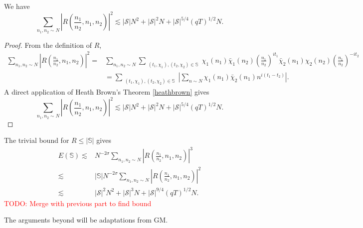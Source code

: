 \begin{lemma}
    We have 
\[
        \sum_{n_1,n_2\sim N}\left|R\left(\frac{n_1}{n_2},n_1,n_2\right) \right|^2\lesssim |\mathcal{S}|N^2+ |\mathcal{S}|^2N + |\mathcal{S}|^{5/4}(qT)^{1/2}N.
    \]
\end{lemma}
\begin{proof}
    From the definition of $R$, \begin{align*}
        \sum_{n_1,n_2\sim N}\left|R\left(\frac{n_1}{n_2},n_1,n_2\right) \right|^2=& \sum_{n_1,n_2\sim N}\sum_{\substack{(t_1,\chi_1),(t_2,\chi_2)\in \mathbb{S}}}
        \chi_1(n_1)\bar{\chi}_1(n_2)\left(\frac{n_1}{n_2}\right)^{it_1}\bar{\chi}_2(n_1){\chi}_2(n_2)\left(\frac{n_1}{n_2}\right)^{-it_2}
        \\
        &=\sum_{\substack{(t_1,\chi_1),(t_2,\chi_2)\in \mathbb{S}}}\left|\sum_{n\sim N}
        \chi_1(n_1)\bar{\chi}_2(n_1)n^{i(t_1-t_2)}\right|.
    \end{align*}
    A direct application of Heath Brown's Theorem \ref{heathbrown} gives \[
        \sum_{n_1,n_2\sim N}\left|R\left(\frac{n_1}{n_2},n_1,n_2\right) \right|^2\lesssim |\mathcal{S}|N^2+ |\mathcal{S}|^2N + |\mathcal{S}|^{5/4}(qT)^{1/2}N.
    \]
\end{proof}
The trivial bound for $R\leq |\mathbb{S}|$ gives \begin{align*}
    E(\mathbb{S})\lesssim& N^{-2\sigma}\sum_{n_1,n_2\sim N}\left|R\left(\frac{n_1}{n_2},n_1,n_2\right) \right|^3\\
    \lesssim &|\mathbb{S}|N^{-2\sigma}\sum_{n_1,n_2\sim N}\left|R\left(\frac{n_1}{n_2},n_1,n_2\right) \right|^2\\
    \lesssim& |\mathcal{S}|^2N^2+ |\mathcal{S}|^3N + |\mathcal{S}|^{9/4}(qT)^{1/2}N.
\end{align*}
\textcolor{red}{TODO: Merge with previous part to find bound}

The arguments beyond will be adaptations from GM. 


